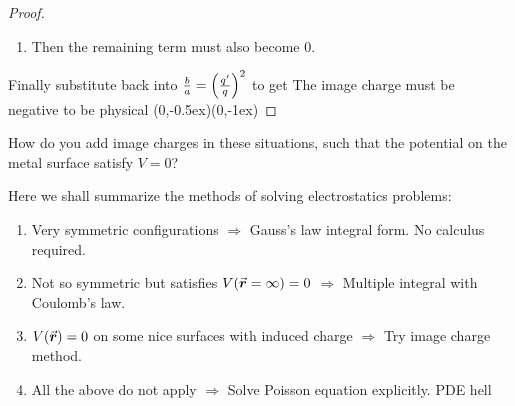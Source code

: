 \documentclass[class=article, crop=false, 12pt]{standalone}
\begin{document}
\begin{example}
\begin{proof}
\begin{enumerate}
            \item Then the remaining term must also become $0$. 
        \end{enumerate}
        
        Finally substitute back into $\frac{b}{a} = \qty(\frac{q'}{q})^2$ to get 
        {\scriptsize The image charge must be\\[-1ex]\scriptsize negative to be physical}
        {(0,-0.5ex)}{(0,-1ex)}


    \end{proof}
\end{example}




\begin{exercise}
    How do you add image charges in these situations,
    such that the potential on the metal surface satisfy $V=0$?


\end{exercise}


\linesep
Here we shall summarize the methods of solving electrostatics problems:
\begin{enumerate}
    \item Very symmetric configurations 
    $\Rightarrow$ Gauss's law integral form. No calculus required.

    \item Not so symmetric but satisfies $V(\va*{r}=\infty)=0$ 
    $\Rightarrow$ Multiple integral with Coulomb's law.

    \item $V(\va*{r})=0$ on some nice surfaces with induced charge
    $\Rightarrow$ Try image charge method.

    \item All the above do not apply 
    $\Rightarrow$ Solve Poisson equation explicitly. PDE hell %
\end{enumerate}

\theend
\end{document}
